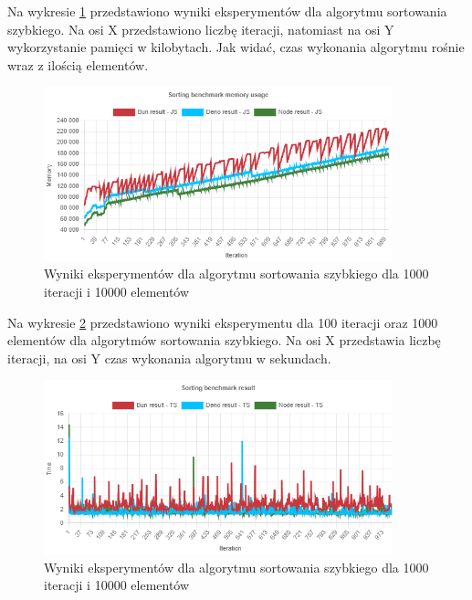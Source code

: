 Na wykresie \ref{fig:radix_sorting_e6_memory_js} przedstawiono wyniki eksperymentów dla algorytmu sortowania szybkiego. Na osi X przedstawiono liczbę iteracji, natomiast na osi Y wykorzystanie pamięci w kilobytach. Jak widać, czas wykonania algorytmu rośnie wraz z ilością elementów.
\begin{figure}[H]
  \centering
  \includegraphics[width=0.9\textwidth]{Figures/sorting/radix/e6_memory_js.png}
  \caption{Wyniki eksperymentów dla algorytmu sortowania szybkiego dla 1000 iteracji i 10000 elementów}
  \label{fig:radix_sorting_e6_memory_js}
\end{figure}

Na wykresie \ref{fig:radix_sorting_e6_ts} przedstawiono wyniki eksperymentu dla 100 iteracji oraz 1000 elementów dla algorytmów sortowania szybkiego. Na osi X przedstawia liczbę iteracji, na osi Y czas wykonania algorytmu w sekundach. 

\begin{figure}[H]
  \centering
  \includegraphics[width=0.9\textwidth]{Figures/sorting/radix/e6_ts.png}
  \caption{Wyniki eksperymentów dla algorytmu sortowania szybkiego dla 1000 iteracji i 10000 elementów}
  \label{fig:radix_sorting_e6_ts}
\end{figure}

